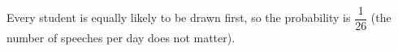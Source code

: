 Every student is equally likely to be drawn first, so the probability is $\boxed{\dfrac{1}{26}}$ (the number of speeches per day does not matter).
